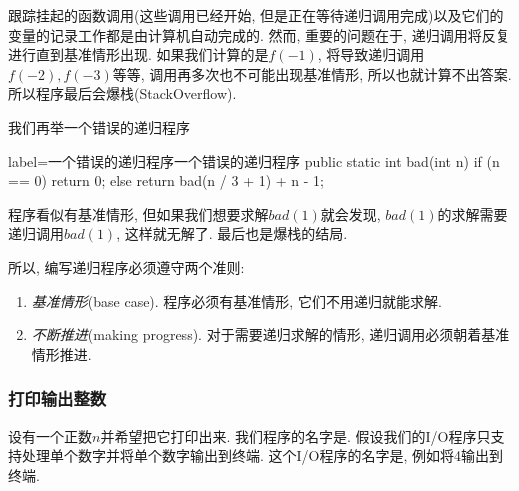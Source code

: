 \documentclass[oneside]{ctexbook}
\begin{document}
跟踪挂起的函数调用(这些调用已经开始, 但是正在等待递归调用完成)以及它们的变量的记录工作都是由计算机自动完成的. 然而, 重要的问题在于, 递归调用将反复进行直到基准情形出现. 如果我们计算的是$f(-1)$, 将导致递归调用$f(-2),f(-3)$等等, 调用再多次也不可能出现基准情形, 所以也就计算不出答案. 所以程序最后会爆栈(StackOverflow).

我们再举一个错误的递归程序

\begin{myjava}{label={一个错误的递归程序}}{一个错误的递归程序}
public static int bad(int n) {
    if (n == 0)
        return 0;
    else
        return bad(n / 3 + 1) + n - 1;
}
\end{myjava}

程序看似有基准情形, 但如果我们想要求解$bad(1)$就会发现, $bad(1)$的求解需要递归调用$bad(1)$, 这样就无解了. 最后也是爆栈的结局.

所以, 编写递归程序必须遵守两个准则:

\begin{enumerate}
    \item \textit{基准情形}(base case). 程序必须有基准情形, 它们不用递归就能求解.
    \item \textit{不断推进}(making progress). 对于需要递归求解的情形, 递归调用必须朝着基准情形推进.
\end{enumerate}

\subsubsection{打印输出整数}

设有一个正数$n$并希望把它打印出来. 我们程序的名字是. 假设我们的I/O程序只支持处理单个数字并将单个数字输出到终端. 这个I/O程序的名字是, 例如将4输出到终端.
\end{document}
